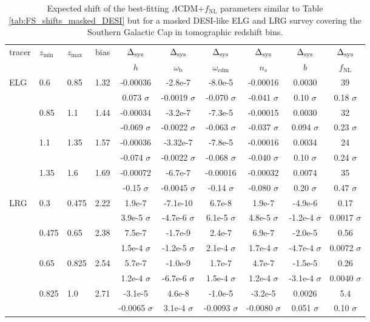 \documentclass[a4paper,11pt]{article}
\begin{document}
\begin{table}[ht]
    \centering
    \begin{tabular}{|l|l|l|c|c|c|c|c|c|c|}
        \hline  tracer & $z_\mathrm{min}$ & $z_\mathrm{max}$ & bias & $\Delta_{\rm sys}$ &$\Delta_{\rm sys}$ &$\Delta_{\rm sys}$ &$\Delta_{\rm sys}$ &$\Delta_{\rm sys}$ &$\Delta_{\rm sys}$ \\ & &
        &  & $h$ & $\omega_\mathrm{b}$ & $\omega_\mathrm{cdm}$ & $n_s$ & $b$ & $f_\mathrm{NL}$ \\\hline\hline
        ELG & 0.6 & 0.85 & 1.32  &  -0.00036
 &  -2.8e-7
 &  -8.0e-5
 &  -0.00016
 &  0.0030
 &  39\\ & & & &  0.073 $\sigma$
 &  -0.0019 $\sigma$
 &  -0.070 $\sigma$
 &  -0.041 $\sigma$
 &  0.10 $\sigma$
 &  0.18 $\sigma$\\
 & 0.85 & 1.1 & 1.44  &  -0.00034
 &  -3.2e-7
 &  -7.3e-5
 &  -0.00015
 &  0.0030
 &  32\\ & & & 
  &  -0.069 $\sigma$
 &  -0.0022 $\sigma$
 &  -0.063 $\sigma$
 &  -0.037 $\sigma$
 &  0.094 $\sigma$
 &  0.23 $\sigma$\\
 & 1.1 & 1.35 & 1.57 &  -0.00036
 &  -3.32e-7
 &  -7.8e-5
 &  -0.00016
 &  0.0034
 &  24\\ & & &
  &  -0.074 $\sigma$
 &  -0.0022 $\sigma$
 &  -0.068 $\sigma$
 &  -0.040 $\sigma$
 &  0.10 $\sigma$
 &  0.24 $\sigma$\\
 & 1.35 & 1.6 & 1.69 &   -0.00072
 &  -6.7e-7
 &  -0.00016
 &  -0.00032
 &  0.0074
 &  35\\ & & & 
  &  -0.15 $\sigma$
 &  -0.0045 $\sigma$
 &  -0.14 $\sigma$
 &  -0.080 $\sigma$
 &  0.20 $\sigma$
 &  0.47 $\sigma$
\\\hline
LRG & 0.3 & 0.475 & 2.22 &  1.9e-7
 &  -7.1e-10
 &  6.7e-8
 &  1.9e-7
 &  -4.9e-6
 &  0.17\\ & & & &  3.9e-5 $\sigma$
 &  -4.7e-6 $\sigma$
 &  6.1e-5 $\sigma$
 &  4.8e-5 $\sigma$
 &  -1.2e-4 $\sigma$
 &  0.0017 $\sigma$\\
 & 0.475 & 0.65 & 2.38  &  7.5e-7
 &  -1.7e-9
 &  2.4e-7
 &  6.9e-7
 &  -2.0e-5
 &  0.56\\ & & &  &  1.5e-4 $\sigma$
 &  -1.2e-5 $\sigma$
 &  2.1e-4 $\sigma$
 &  1.7e-4 $\sigma$
 &  -4.7e-4 $\sigma$
 &  0.0072 $\sigma$\\
 & 0.65 & 0.825 & 2.54  &  5.7e-7
 &  -1.0e-9
 &  1.7e-7
 &  4.7e-7
 &  -1.5e-5
 &  0.26\\ & & & &  1.2e-4 $\sigma$
 &  -6.7e-6 $\sigma$
 &  1.5e-4 $\sigma$
 &  1.2e-4 $\sigma$
 &  -3.1e-4 $\sigma$
 &  0.0040 $\sigma$\\
 & 0.825 & 1.0 & 2.71  &  -3.1e-5
 &  4.6e-8
 &  -1.0e-5
 &  -3.2e-5
 &  0.0026
 &  5.4\\ & & &  &  -0.0065 $\sigma$
 &  3.1e-4 $\sigma$
 &  -0.0093 $\sigma$
 &  -0.0080 $\sigma$
 &  0.051 $\sigma$
 &  0.10 $\sigma$\\\hline
    \end{tabular}
    \caption{Expected shift of the best-fitting $\Lambda$CDM+$f_\mathrm{NL}$ parameters similar to Table \ref{tab:FS_shifts_masked_DESI} but for a masked DESI-like ELG and LRG survey covering the Southern Galactic Cap in tomographic redshift bins.}
    \label{tab:DESI_tomo}
\end{table}
\end{document}
